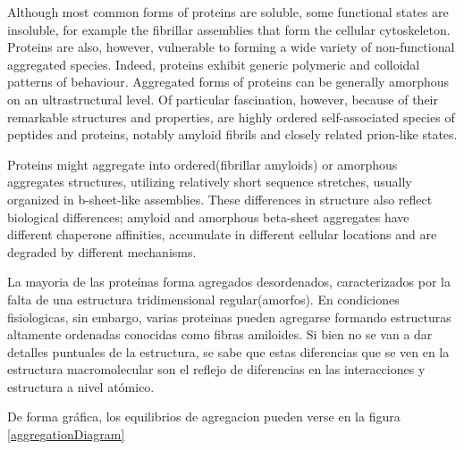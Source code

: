 
Although most common forms of proteins are
soluble, some functional states are insoluble,
for example the fibrillar assemblies that form the cellular
cytoskeleton. Proteins are also, however,
vulnerable to forming a wide variety of non-functional
aggregated species. 
Indeed, proteins exhibit generic polymeric and colloidal patterns of behaviour.
Aggregated forms of proteins can be generally amorphous on an ultrastructural level. Of particular fascination, however, because of their
remarkable structures and properties, are highly ordered
self-associated species of peptides and proteins, notably
amyloid fibrils and closely related prion-like states.


Proteins might aggregate into ordered(fibrillar amyloids) or amorphous aggregates structures, utilizing relatively short sequence stretches, usually organized in b-sheet-like assemblies. 
These differences in structure also reflect biological differences; amyloid and amorphous beta-sheet aggregates have different chaperone affinities, accumulate in different cellular locations and are degraded by different mechanisms.

La mayoria de las proteínas forma agregados desordenados, caracterizados por la falta de una estructura tridimensional regular(amorfos).
En condiciones fisiologicas, sin embargo, varias proteinas pueden agregarse formando estructuras altamente ordenadas conocidas como fibras amiloides.
Si bien no se van a dar detalles puntuales de la estructura, se sabe que estas diferencias que se ven en la estructura macromolecular son el reflejo de diferencias en las interacciones y estructura a nivel atómico.


De forma gráfica, los equilibrios de agregacion pueden verse en la figura \ref{aggregationDiagram}

